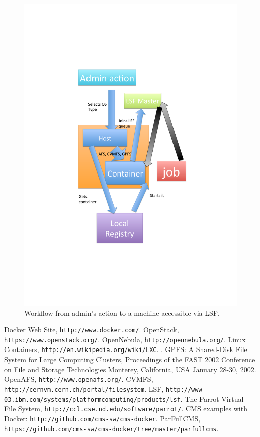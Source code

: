 \documentclass{PoS}
\begin{document}
\begin{figure}
\begin{center}
\includegraphics[width=.8\textwidth]{dockerpisa.pdf}
\caption{Workflow from admin's action to a machine accessible via LSF.}
\label{fig:dockerPisa}
\end{center}
\end{figure}
%


\begin{thebibliography}{99}
 Docker Web Site, \texttt{http://www.docker.com/}.
OpenStack, \texttt{https://www.openstack.org/}.
OpenNebula, \texttt{http://opennebula.org/}.
Linux Containers, \texttt{http://en.wikipedia.org/wiki/LXC}.
. GPFS: A Shared-Disk File System for Large Computing Clusters, Proceedings of the FAST 2002 Conference on File and Storage Technologies Monterey, California, USA January 28-30, 2002.
 OpenAFS, \texttt{http://www.openafs.org/}.
 CVMFS, \texttt{http://cernvm.cern.ch/portal/filesystem}.
 LSF, \texttt{http://www-03.ibm.com/systems/platformcomputing/products/lsf}.
The Parrot Virtual File System, \texttt{http://ccl.cse.nd.edu/software/parrot/}.
 CMS examples with Docker: \texttt{http://github.com/cms-sw/cms-docker}.
 ParFullCMS, \texttt{https://github.com/cms-sw/cms-docker/tree/master/parfullcms}.




\end{thebibliography}
\end{document}
